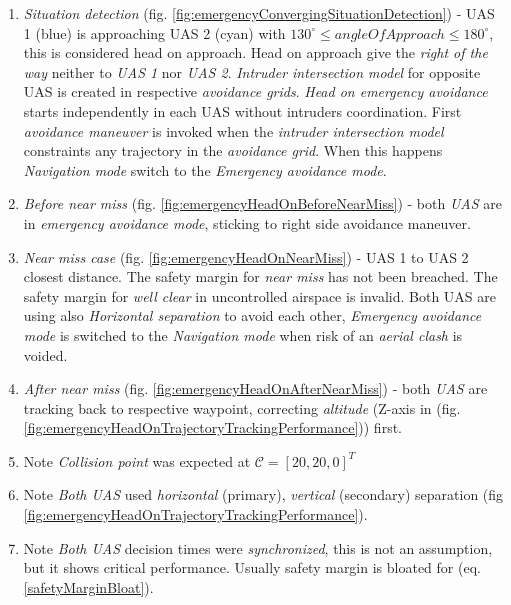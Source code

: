 \begin{enumerate}
    \item \emph{Situation detection} (fig. \ref{fig:emergencyConvergingSituationDetection}) - UAS 1 (blue)  is approaching UAS 2 (cyan) with $130^\circ \le angle Of Approach \le 180^\circ$, this is considered head on approach. Head on approach  give the \emph{right of the way} neither to \emph{UAS 1} nor \emph{UAS 2}. \emph{Intruder intersection model} for opposite UAS is created in respective \emph{avoidance grids}. \emph{Head on emergency avoidance} starts independently in each UAS without intruders coordination. First \emph{avoidance maneuver} is invoked when the \emph{intruder intersection model} constraints any trajectory in the \emph{avoidance grid}. When this happens \emph{Navigation mode} switch to the \emph{Emergency avoidance mode}.
                
    \item \emph{Before near miss} (fig. \ref{fig:emergencyHeadOnBeforeNearMiss}) - both \emph{UAS} are in \emph{emergency avoidance mode}, sticking to right side avoidance maneuver.
    
    \item \emph{Near miss case} (fig. \ref{fig:emergencyHeadOnNearMiss}) - UAS 1 to UAS 2 closest distance. The safety margin for \emph{near miss} has not been breached. The safety margin for \emph{well clear} in uncontrolled airspace is invalid. Both UAS are using also \emph{Horizontal separation} to avoid each other, \emph{Emergency avoidance mode} is switched to the \emph{Navigation mode} when risk of an \emph{aerial clash} is voided.
    
    \item \emph{After near miss} (fig. \ref{fig:emergencyHeadOnAfterNearMiss}) - both \emph{UAS} are tracking back to respective waypoint, correcting \emph{altitude} (Z-axis in (fig. \ref{fig:emergencyHeadOnTrajectoryTrackingPerformance})) first.
    
    \item Note \emph{Collision point} was expected at $\mathscr{C}=[20,20,0]^T$
    
    \item Note \emph{Both UAS} used \emph{horizontal} (primary), \emph{vertical} (secondary) separation (fig \ref{fig:emergencyHeadOnTrajectoryTrackingPerformance}).
    
    \item Note \emph{Both UAS} decision times were \emph{synchronized}, this is not an assumption, but it shows critical performance. Usually safety margin is bloated for (eq.\ref{safetyMarginBloat}).
\end{enumerate}


